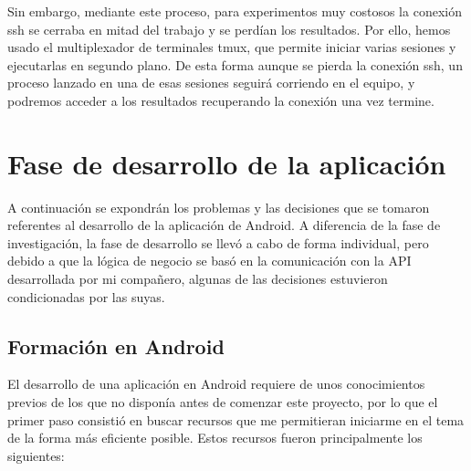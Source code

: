 Sin embargo, mediante este proceso, para experimentos muy costosos la conexión ssh se cerraba en mitad del trabajo y se perdían los resultados. Por ello, hemos usado el multiplexador de terminales tmux, que permite iniciar varias sesiones y ejecutarlas en segundo plano. De esta forma aunque se pierda la conexión ssh, un proceso lanzado en una de esas sesiones seguirá corriendo en el equipo, y podremos acceder a los resultados recuperando la conexión una vez termine. 

\section{Fase de desarrollo de la aplicación}

A continuación se expondrán los problemas y las decisiones que se tomaron referentes al desarrollo de la aplicación de Android. A diferencia de la fase de investigación, la fase de desarrollo se llevó a cabo de forma individual, pero debido a que la lógica de negocio se basó en la comunicación con la API desarrollada por mi compañero, algunas de las decisiones estuvieron condicionadas por las suyas. 

\subsection{Formación en Android}

El desarrollo de una aplicación en Android requiere de unos conocimientos previos de los que no disponía antes de comenzar este proyecto, por lo que el primer paso consistió en buscar recursos que me permitieran iniciarme en el tema de la forma más eficiente posible. Estos recursos fueron principalmente los siguientes: 


